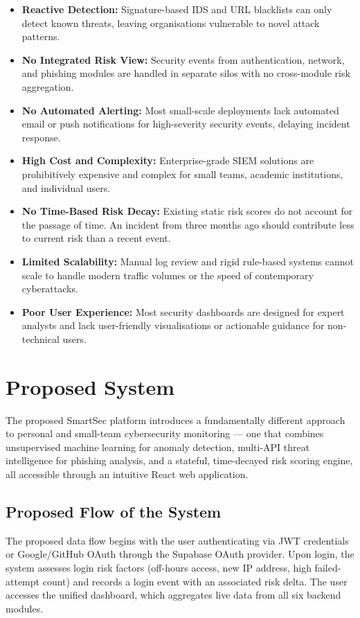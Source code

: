 \begin{itemize}
    \item \textbf{Reactive Detection:} Signature-based IDS and URL blacklists can only detect known threats, leaving organisations vulnerable to novel attack patterns.
    \item \textbf{No Integrated Risk View:} Security events from authentication, network, and phishing modules are handled in separate silos with no cross-module risk aggregation.
    \item \textbf{No Automated Alerting:} Most small-scale deployments lack automated email or push notifications for high-severity security events, delaying incident response.
    \item \textbf{High Cost and Complexity:} Enterprise-grade SIEM solutions are prohibitively expensive and complex for small teams, academic institutions, and individual users.
    \item \textbf{No Time-Based Risk Decay:} Existing static risk scores do not account for the passage of time. An incident from three months ago should contribute less to current risk than a recent event.
    \item \textbf{Limited Scalability:} Manual log review and rigid rule-based systems cannot scale to handle modern traffic volumes or the speed of contemporary cyberattacks.
    \item \textbf{Poor User Experience:} Most security dashboards are designed for expert analysts and lack user-friendly visualisations or actionable guidance for non-technical users.
\end{itemize}

\section{Proposed System}

The proposed SmartSec platform introduces a fundamentally different approach to personal and small-team cybersecurity monitoring --- one that combines unsupervised machine learning for anomaly detection, multi-API threat intelligence for phishing analysis, and a stateful, time-decayed risk scoring engine, all accessible through an intuitive React web application.

\subsection*{Proposed Flow of the System}

The proposed data flow begins with the user authenticating via JWT credentials or Google/GitHub OAuth through the Supabase OAuth provider. Upon login, the system assesses login risk factors (off-hours access, new IP address, high failed-attempt count) and records a login event with an associated risk delta. The user accesses the unified dashboard, which aggregates live data from all six backend modules.

